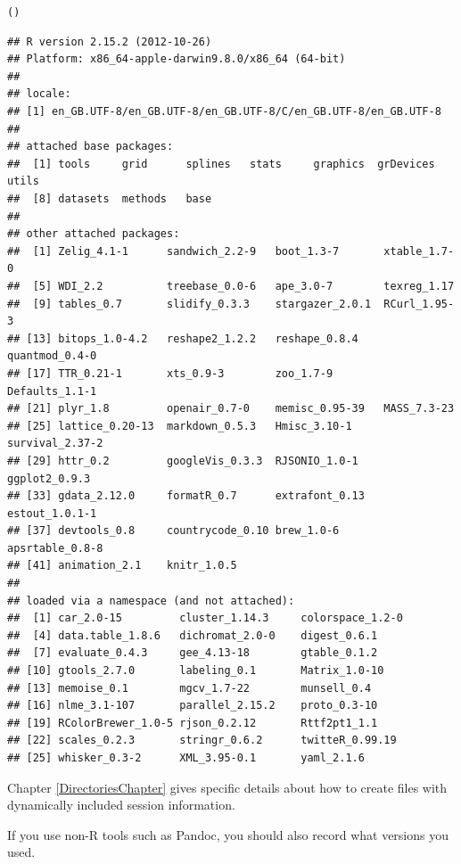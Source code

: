 \documentclass[krantz1]{krantz}
\begin{document}
{\footnotesize{
\begin{knitrout}
\color{fgcolor}\begin{kframe}
\begin{alltt}
()
\end{alltt}
\begin{verbatim}
## R version 2.15.2 (2012-10-26)
## Platform: x86_64-apple-darwin9.8.0/x86_64 (64-bit)
## 
## locale:
## [1] en_GB.UTF-8/en_GB.UTF-8/en_GB.UTF-8/C/en_GB.UTF-8/en_GB.UTF-8
## 
## attached base packages:
##  [1] tools     grid      splines   stats     graphics  grDevices utils    
##  [8] datasets  methods   base     
## 
## other attached packages:
##  [1] Zelig_4.1-1      sandwich_2.2-9   boot_1.3-7       xtable_1.7-0    
##  [5] WDI_2.2          treebase_0.0-6   ape_3.0-7        texreg_1.17     
##  [9] tables_0.7       slidify_0.3.3    stargazer_2.0.1  RCurl_1.95-3    
## [13] bitops_1.0-4.2   reshape2_1.2.2   reshape_0.8.4    quantmod_0.4-0  
## [17] TTR_0.21-1       xts_0.9-3        zoo_1.7-9        Defaults_1.1-1  
## [21] plyr_1.8         openair_0.7-0    memisc_0.95-39   MASS_7.3-23     
## [25] lattice_0.20-13  markdown_0.5.3   Hmisc_3.10-1     survival_2.37-2 
## [29] httr_0.2         googleVis_0.3.3  RJSONIO_1.0-1    ggplot2_0.9.3   
## [33] gdata_2.12.0     formatR_0.7      extrafont_0.13   estout_1.0.1-1  
## [37] devtools_0.8     countrycode_0.10 brew_1.0-6       apsrtable_0.8-8 
## [41] animation_2.1    knitr_1.0.5     
## 
## loaded via a namespace (and not attached):
##  [1] car_2.0-15         cluster_1.14.3     colorspace_1.2-0  
##  [4] data.table_1.8.6   dichromat_2.0-0    digest_0.6.1      
##  [7] evaluate_0.4.3     gee_4.13-18        gtable_0.1.2      
## [10] gtools_2.7.0       labeling_0.1       Matrix_1.0-10     
## [13] memoise_0.1        mgcv_1.7-22        munsell_0.4       
## [16] nlme_3.1-107       parallel_2.15.2    proto_0.3-10      
## [19] RColorBrewer_1.0-5 rjson_0.2.12       Rttf2pt1_1.1      
## [22] scales_0.2.3       stringr_0.6.2      twitteR_0.99.19   
## [25] whisker_0.3-2      XML_3.95-0.1       yaml_2.1.6
\end{verbatim}
\end{kframe}
\end{knitrout}

}}
\noindent Chapter \ref{DirectoriesChapter} gives specific details about how to create files with dynamically included session information.

If you use non-R tools such as Pandoc, you should also record what versions you used.
\end{document}

